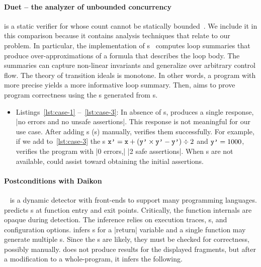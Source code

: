 \paragraph*{Duet -- the analyzer of unbounded concurrency}
 is a static verifier for  whose 
count cannot be statically bounded~\cite{duet}. We include it in this comparison
because it contains analysis techniques that relate to our problem. In
particular, the implementation of {s}~\cite{cyphert2024}
computes {loop summaries} that produce over-approximations of a formula that
describes the loop body. The summaries can capture non-linear
invariants and generalize over arbitrary control
flow. The theory of transition ideals is monotone. In other words, a program
with more precise  yields a more informative loop summary.
Then,  aims to prove program correctness using the s
generated from s.

\begin{itemize}
\item Listings~\ref{lst:case-1} --~\ref{lst:case-3}:
    In absence of s,  produces a
    single response, \pr|no errors and no unsafe assertions|. This response is
    not meaningful for our use case. After adding s
    (s) manually,  verifies them
    successfully. For example, if we add to~\autoref{lst:case-3} the
    s
    \(\prm{x'}=\prm{x}+(\prm{y'}\times\prm{y'}-\prm{y'}) \div 2 \) and
    \(\prm{y'}=1000 \),  verifies the program with \pr|0 errors,|
    \pr|2 safe assertions|. When s are not
    available, \ndx{\impl} could assist  toward obtaining the initial
    assertions.
\end{itemize}

\paragraph*{Postconditions with Daikon}
~\cite{ernst2007,daikon} is a dynamic
 detector with front-ends to support many programming languages.
 predicts s at function entry and exit points.
Critically, the function internals are opaque during  detection.
The inference relies on execution traces, s, and configuration options.  infers s
for a \pr|return| variable and a single function may generate multiple
s. Since the s are likely, they must be
checked for correctness, possibly manually.  does not produce
results for the displayed fragments, but after a modification to a
whole-program, it infers the following.

